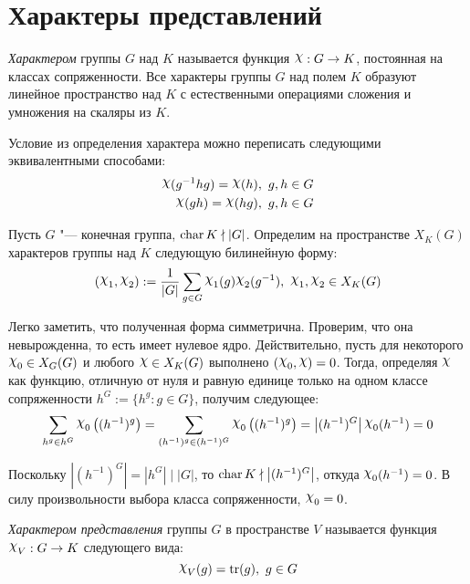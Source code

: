 \section{Характеры представлений}

\begin{definition}
	\textit{Характером} группы $G$ над $K$ называется функция $\Chi : G \to K$, постоянная на классах сопряженности. Все характеры группы $G$ над полем $K$ образуют линейное пространство над $K$ с естественными операциями сложения и умножения на скаляры из $K$.
\end{definition}

\begin{note}
	Условие из определения характера можно переписать следующими эквивалентными способами:
	\begin{align*}
		\Chi(g^{-1}hg) = \Chi(h),~g, h \in G\\
		\Chi(gh) = \Chi(hg),~g, h \in G
	\end{align*}
\end{note}

\begin{note}
	Пусть $G$ "--- конечная группа, $\operatorname{char} K \nmid |G|$. Определим на пространстве $X_K(G)$ характеров группы над $K$ следующую билинейную форму:
	\[(\Chi_1, \Chi_2) := \frac1{|G|}\sum_{g \in G}\Chi_1(g)\Chi_2(g^{-1}),~\Chi_1, \Chi_2 \in X_K(G)\]
	
	Легко заметить, что полученная форма симметрична. Проверим, что она невырожденна, то есть имеет нулевое ядро. Действительно, пусть для некоторого $\Chi_0 \in X_G(G)$ и любого $\Chi \in X_K(G)$ выполнено $(\Chi_0, \Chi) = 0$. Тогда, определяя $\Chi$ как функцию, отличную от нуля и равную единице только на одном классе сопряженности $h^G := \{h^g : g \in G\}$, получим следующее:
	\[\sum_{h^g \in h^G}\Chi_0\left((h^{-1})^g\right) = \sum_{(h^{-1})^g \in (h^{-1})^G}\Chi_0\left((h^{-1})^g\right) = \left|(h^{-1})^G\right| \Chi_0(h^{-1}) = 0\]
	
	Поскольку $\left|(h^{-1})^G\right| = \left|h^G\right| \mid |G|$, то $\operatorname{char} K \nmid \left|(h^{-1})^G\right|$, откуда $\Chi_0(h^{-1}) = 0$. В силу произвольности выбора класса сопряженности, $\Chi_0 = 0$.
\end{note}

\begin{definition}
	\textit{Характером представления} группы $G$ в пространстве $V$ называется функция $\Chi_V: G \to K$ следующего вида:
	\[\Chi_V(g) = \tr(g),~g \in G\]
\end{definition}

